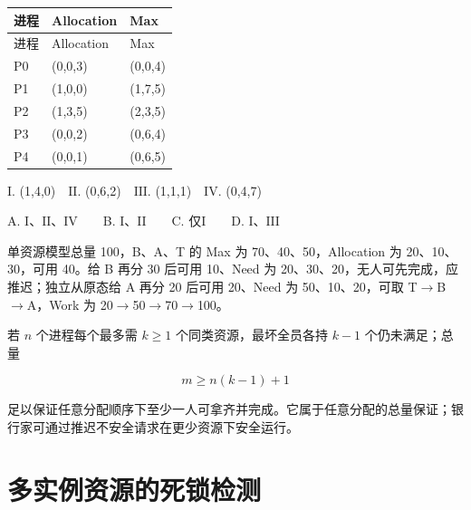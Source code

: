 \par\smallskip
{\fontsize{9.3}{12}\selectfont\setlength{\tabcolsep}{2.5pt}\setlength{\LTleft}{0pt}\setlength{\LTright}{0pt}
\begin{longtable}{@{}>{\raggedright\arraybackslash}p{}>{\raggedright\arraybackslash}p{}>{\raggedright\arraybackslash}p{}@{}}
\toprule
进程 & Allocation & Max \\

\midrule\endfirsthead\toprule
进程 & Allocation & Max \\

\midrule\endhead\bottomrule\endfoot
P0 & (0,0,3) & (0,0,4) \\

P1 & (1,0,0) & (1,7,5) \\

P2 & (1,3,5) & (2,3,5) \\

P3 & (0,0,2) & (0,6,4) \\

P4 & (0,0,1) & (0,6,5) \\

\end{longtable}}
\par\smallskip

\ensuremath{\mathrm{I}}. (1,4,0)　\ensuremath{\mathrm{II}}. (0,6,2)　\ensuremath{\mathrm{III}}. (1,1,1)　\ensuremath{\mathrm{IV}}. (0,4,7)

A. \ensuremath{\mathrm{I}}、\ensuremath{\mathrm{II}}、\ensuremath{\mathrm{IV}}　　B. \ensuremath{\mathrm{I}}、\ensuremath{\mathrm{II}}　　C. 仅\ensuremath{\mathrm{I}}　　D. \ensuremath{\mathrm{I}}、\ensuremath{\mathrm{III}}

单资源模型总量 100，B、A、T 的 Max 为 70、40、50，Allocation 为 20、10、30，可用 40。给 B 再分 30 后可用 10、Need 为 20、30、20，无人可先完成，应推迟；独立从原态给 A 再分 20 后可用 20、Need 为 50、10、20，可取 T\ensuremath{\to}B\ensuremath{\to}A，Work 为 20\ensuremath{\to}50\ensuremath{\to}70\ensuremath{\to}100。

若 \(n\) 个进程每个最多需 \(k\ge1\) 个同类资源，最坏全员各持 \(k-1\) 个仍未满足；总量

\[m\ge n(k-1)+1\]

足以保证任意分配顺序下至少一人可拿齐并完成。它属于任意分配的总量保证；银行家可通过推迟不安全请求在更少资源下安全运行。

\section{多实例资源的死锁检测}\label{OS02-detection}

